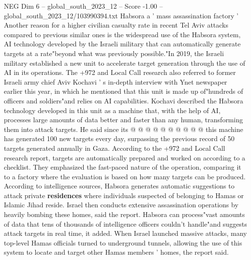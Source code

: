 \begin{textsample}{NEG Dim 6 – global\_south\_2023\_12 – Score -1.00 – global\_south\_2023\_12/103990394.txt}
Habsora a ' mass assassination factory ' Another reason for a higher civilian casualty rate in recent Tel Aviv attacks compared to previous similar ones is the widespread use of the Habsora system, AI technology developed by the Israeli military that can automatically generate targets at a rate"beyond what was previously possible."In 2019, the Israeli military established a new unit to accelerate target generation through the use of AI in its operations.
The +972 and Local Call research also referred to former Israeli army chief Aviv Kochavi ' s in-depth interview with Ynet newspaper earlier this year, in which he mentioned that this unit is made up of"hundreds of officers and soldiers"and relies on AI capabilities.
Kochavi described the Habsora technology developed in this unit as a machine that, with the help of AI, processes large amounts of data better and faster than any human, transforming them into attack targets.
He said since its @ @ @ @ @ @ @ @ @ @ this machine has generated 100 new targets every day, surpassing the previous record of 50 targets generated annually in Gaza.
According to the +972 and Local Call research report, targets are automatically prepared and worked on according to a checklist.
They emphasized the fast-paced nature of the operation, comparing it to a factory where the evaluation is based on how many targets can be produced.
According to intelligence sources, Habsora generates automatic suggestions to attack private \textbf{residences} where individuals suspected of belonging to Hamas or Islamic Jihad reside.
Israel then conducts extensive assassination operations by heavily bombing these homes, said the report.
Habsora can process"vast amounts of data that tens of thousands of intelligence officers couldn't handle"and suggests attack targets in real time, it added.
When Israel launched massive attacks, many top-level Hamas officials turned to underground tunnels, allowing the use of this system to locate and target other Hamas members ' homes, the report said.

\end{textsample}
